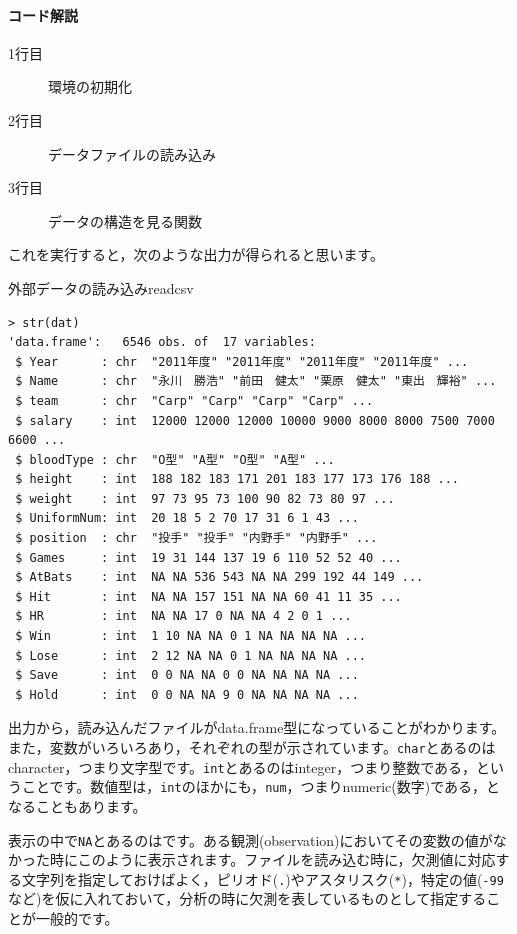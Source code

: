\documentclass{ltjsbook}
\begin{document}
\paragraph{コード解説}
\begin{description}
	\item[1行目] 環境の初期化
	\item[2行目] データファイルの読み込み
	\item[3行目] データの構造を見る関数
\end{description}

これを実行すると，次のような出力が得られると思います。
\begin{Rscreen}{外部データの読み込み}{readcsv}
\begin{verbatim}
> str(dat)
'data.frame':	6546 obs. of  17 variables:
 $ Year      : chr  "2011年度" "2011年度" "2011年度" "2011年度" ...
 $ Name      : chr  "永川　勝浩" "前田　健太" "栗原　健太" "東出　輝裕" ...
 $ team      : chr  "Carp" "Carp" "Carp" "Carp" ...
 $ salary    : int  12000 12000 12000 10000 9000 8000 8000 7500 7000 6600 ...
 $ bloodType : chr  "O型" "A型" "O型" "A型" ...
 $ height    : int  188 182 183 171 201 183 177 173 176 188 ...
 $ weight    : int  97 73 95 73 100 90 82 73 80 97 ...
 $ UniformNum: int  20 18 5 2 70 17 31 6 1 43 ...
 $ position  : chr  "投手" "投手" "内野手" "内野手" ...
 $ Games     : int  19 31 144 137 19 6 110 52 52 40 ...
 $ AtBats    : int  NA NA 536 543 NA NA 299 192 44 149 ...
 $ Hit       : int  NA NA 157 151 NA NA 60 41 11 35 ...
 $ HR        : int  NA NA 17 0 NA NA 4 2 0 1 ...
 $ Win       : int  1 10 NA NA 0 1 NA NA NA NA ...
 $ Lose      : int  2 12 NA NA 0 1 NA NA NA NA ...
 $ Save      : int  0 0 NA NA 0 0 NA NA NA NA ...
 $ Hold      : int  0 0 NA NA 9 0 NA NA NA NA ...
\end{verbatim}
\end{Rscreen}
出力から，読み込んだファイルがdata.frame型になっていることがわかります。また，変数がいろいろあり，それぞれの型が示されています。\verb|char|とあるのはcharacter，つまり文字型です。\verb|int|とあるのはinteger，つまり整数である，ということです。数値型は，\verb|int|のほかにも，\verb|num|，つまりnumeric(数字)である，となることもあります。

表示の中で\verb|NA|とあるのはです。ある観測(observation)においてその変数の値がなかった時にこのように表示されます。ファイルを読み込む時に，欠測値に対応する文字列を指定しておけばよく，ピリオド(\verb|.|)やアスタリスク(\verb|*|)，特定の値(\verb|-99|など)を仮に入れておいて，分析の時に欠測を表しているものとして指定することが一般的です。
\end{document}
